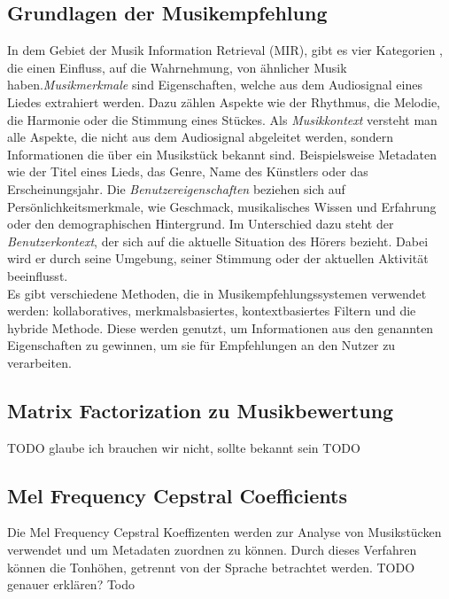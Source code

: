 \documentclass[twosided,a4,10pt]{article}
\begin{document}
\begin{multicols}{2}
		\section{Grundlagen der Musikempfehlung}
		In dem Gebiet der Musik Information Retrieval (MIR), gibt es vier Kategorien \cite{schedl}, die einen Einfluss, auf die Wahrnehmung, von ähnlicher Musik haben.\newline \textit{Musikmerkmale} sind Eigenschaften, welche aus dem Audiosignal eines Liedes extrahiert werden. Dazu zählen Aspekte wie der Rhythmus, die Melodie, die Harmonie oder die Stimmung eines Stückes.\newline
		Als \textit{Musikkontext} versteht man alle Aspekte, die nicht aus dem Audiosignal abgeleitet werden, sondern Informationen die über ein Musikstück bekannt sind. Beispielsweise Metadaten wie der Titel eines Lieds, das Genre, Name des Künstlers oder das Erscheinungsjahr.\newline
		Die \textit{Benutzereigenschaften} beziehen sich auf Persönlichkeitsmerkmale, wie Geschmack, musikalisches Wissen und Erfahrung oder den demographischen Hintergrund.\newline
		Im Unterschied dazu steht der \textit{Benutzerkontext}, der sich auf die aktuelle Situation des Hörers bezieht. Dabei wird er durch seine Umgebung, seiner Stimmung oder der aktuellen Aktivität beeinflusst. \cite{knees}\newline\\
		Es gibt verschiedene Methoden, die in Musikempfehlungssystemen verwendet werden: kollaboratives, merkmalsbasiertes, kontextbasiertes Filtern und die hybride Methode. Diese werden genutzt, um Informationen aus den genannten Eigenschaften zu gewinnen, um sie für Empfehlungen an den Nutzer zu verarbeiten. \cite{wang}
		\subsection{Matrix Factorization zu Musikbewertung}
		TODO glaube ich brauchen wir nicht, sollte bekannt sein TODO
		\subsection{Mel Frequency Cepstral Coefficients}
		Die Mel Frequency Cepstral Koeffizenten werden zur Analyse von Musikstücken verwendet und um Metadaten zuordnen zu können. Durch dieses Verfahren können die Tonhöhen, getrennt von der Sprache betrachtet werden. TODO genauer erklären? Todo

\end{multicols}
\end{document}
